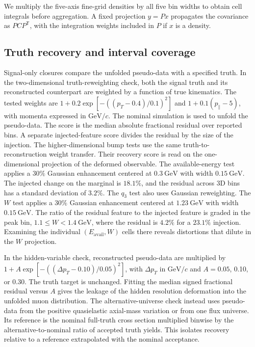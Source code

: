 We multiply the five-axis fine-grid densities by all five bin widths to obtain cell integrals before aggregation. A fixed projection $y=Px$ propagates the covariance as $PCP^{\mathsf T}$, with the integration weights included in $P$ if $x$ is a density.

\subsection{Truth recovery and interval coverage}
\label{sec:closure}
\label{sec:closure-tr}
\label{sec:closure-hv}
\label{sec:closure-alt}

Signal-only closures compare the unfolded pseudo-data with a specified truth. In the two-dimensional truth-reweighting check, both the signal truth and its reconstructed counterpart are weighted by a function of true kinematics. The tested weights are $1+0.2\exp[-((p_T-0.4)/0.1)^2]$ and $1+0.1(p_\parallel-5)$, with momenta expressed in $\mathrm{GeV}/c$. The nominal simulation is used to unfold the pseudo-data. The score is the median absolute fractional residual over reported bins. A separate injected-feature score divides the residual by the size of the injection. The higher-dimensional bump tests use the same truth-to-reconstruction weight transfer. Their recovery score is read on the one-dimensional projection of the deformed observable. The available-energy test applies a $30\%$ Gaussian enhancement centered at $0.3~\mathrm{GeV}$ with width $0.15~\mathrm{GeV}$. The injected change on the marginal is $18.1\%$, and the residual across 3D bins has a standard deviation of $3.2\%$. The $q_3$ test also uses Gaussian reweighting. The $W$ test applies a $30\%$ Gaussian enhancement centered at $1.23~\mathrm{GeV}$ with width $0.15~\mathrm{GeV}$. The ratio of the residual feature to the injected feature is graded in the peak bin, $1.1\leq W<1.4~\mathrm{GeV}$, where the residual is $4.2\%$ for a $23.1\%$ injection. Examining the individual $(E_{\mathrm{avail}},W)$ cells there reveals distortions that dilute in the $W$ projection.

In the hidden-variable check, reconstructed pseudo-data are multiplied by $1+A\exp[-((\Delta p_T-0.10)/0.05)^2]$, with $\Delta p_T$ in $\mathrm{GeV}/c$ and $A=0.05$, 0.10, or 0.30. The truth target is unchanged. Fitting the median signed fractional residual versus $A$ gives the leakage of the hidden resolution deformation into the unfolded muon distribution. The alternative-universe check instead uses pseudo-data from the positive quasielastic axial-mass variation or from one flux universe. Its reference is the nominal full-truth cross section multiplied binwise by the alternative-to-nominal ratio of accepted truth yields. This isolates recovery relative to a reference extrapolated with the nominal acceptance.

